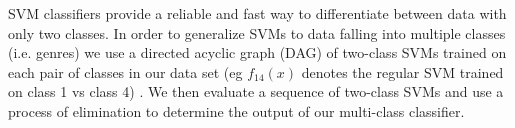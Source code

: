 SVM classifiers provide a reliable and fast way to differentiate between data with only two classes. In order to generalize SVMs to data falling into multiple classes (i.e. genres) we use a directed acyclic graph (DAG) of two-class SVMs trained on each pair of classes in our data set (eg $f_{14}(x)$ denotes the regular SVM trained on class 1 vs class 4) \cite{dag}. We then evaluate a sequence of two-class SVMs and use a process of elimination to determine the output of our multi-class classifier.
